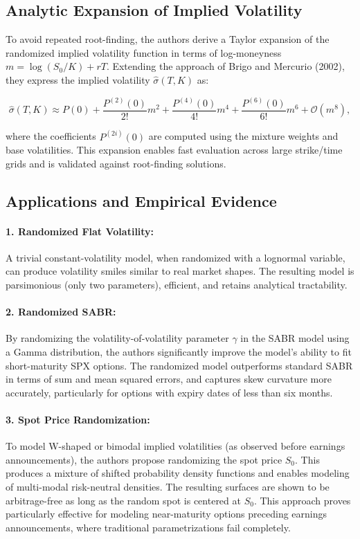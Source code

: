 \subsection{Analytic Expansion of Implied Volatility}

To avoid repeated root-finding, the authors derive a Taylor expansion of the randomized implied volatility function in terms of log-moneyness $m = \log(S_0/K) + rT$. Extending the approach of Brigo and Mercurio (2002), they express the implied volatility $\hat{\sigma}(T,K)$ as:

\[
    \hat{\sigma}(T,K) \approx P(0) + \frac{P^{(2)}(0)}{2!}m^2 + \frac{P^{(4)}(0)}{4!}m^4 + \frac{P^{(6)}(0)}{6!}m^6 + \mathcal{O}(m^8),
\]

where the coefficients $P^{(2i)}(0)$ are computed using the mixture weights and base volatilities. This expansion enables fast evaluation across large strike/time grids and is validated against root-finding solutions.

\subsection{Applications and Empirical Evidence}

\paragraph{1. Randomized Flat Volatility:}
A trivial constant-volatility model, when randomized with a lognormal variable, can produce volatility smiles similar to real market shapes. The resulting model is parsimonious (only two parameters), efficient, and retains analytical tractability.

\paragraph{2. Randomized SABR:}
By randomizing the volatility-of-volatility parameter $\gamma$ in the SABR model using a Gamma distribution, the authors significantly improve the model's ability to fit short-maturity SPX options. The randomized model outperforms standard SABR in terms of sum and mean squared errors, and captures skew curvature more accurately, particularly for options with expiry dates of less than six months.

\paragraph{3. Spot Price Randomization:}
To model W-shaped or bimodal implied volatilities (as observed before earnings announcements), the authors propose randomizing the spot price $S_0$. This produces a mixture of shifted probability density functions and enables modeling of multi-modal risk-neutral densities. The resulting surfaces are shown to be arbitrage-free as long as the random spot is centered at $S_0$. This approach proves particularly effective for modeling near-maturity options preceding earnings announcements, where traditional parametrizations fail completely.

